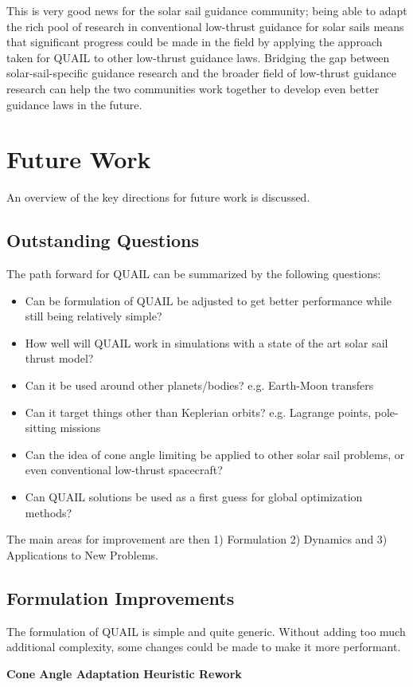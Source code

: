 This is very good news for the solar sail guidance community; being able to adapt the rich pool of research in conventional low-thrust guidance for solar sails means that significant progress could be made in the field by applying the approach taken for QUAIL to other low-thrust guidance laws. Bridging the gap between solar-sail-specific guidance research and the broader field of low-thrust guidance research can help the two communities work together to develop even better guidance laws in the future.

\section{Future Work}
An overview of the key directions for future work is discussed.
\subsection{Outstanding Questions}
The path forward for QUAIL can be summarized by the following questions:
\begin{itemize}
    \item Can be formulation of QUAIL be adjusted to get better performance while still being relatively simple?
    \item How well will QUAIL work in simulations with a state of the art solar sail thrust model?
    \item Can it be used around other planets/bodies? e.g. Earth-Moon transfers
    \item Can it target things other than Keplerian orbits? e.g. Lagrange points, pole-sitting missions
    \item Can the idea of cone angle limiting be applied to other solar sail problems, or even conventional low-thrust spacecraft?
    \item Can QUAIL solutions be used as a first guess for global optimization methods?
\end{itemize}
The main areas for improvement are then 1) Formulation 2) Dynamics and 3) Applications to New Problems.

\subsection{Formulation Improvements}
The formulation of QUAIL is simple and quite generic. Without adding too much additional complexity, some changes could be made to make it more performant.

\textbf{Cone Angle Adaptation Heuristic Rework}

